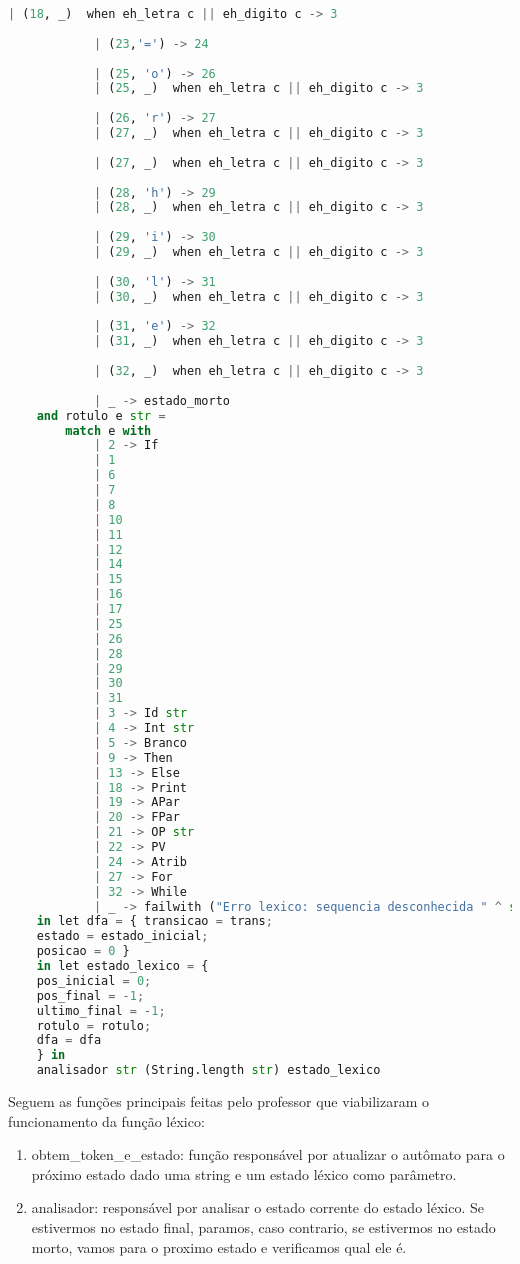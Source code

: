 \documentclass[hidelinks,12pt]{article}
\begin{document}
\begin{lstlisting}[caption=Código em python,language=python]
			| (18, _)  when eh_letra c || eh_digito c -> 3
			
			| (23,'=') -> 24
			
			| (25, 'o') -> 26
			| (25, _)  when eh_letra c || eh_digito c -> 3
			
			| (26, 'r') -> 27
			| (27, _)  when eh_letra c || eh_digito c -> 3
			
			| (27, _)  when eh_letra c || eh_digito c -> 3
			
			| (28, 'h') -> 29
			| (28, _)  when eh_letra c || eh_digito c -> 3
			
			| (29, 'i') -> 30
			| (29, _)  when eh_letra c || eh_digito c -> 3
			
			| (30, 'l') -> 31
			| (30, _)  when eh_letra c || eh_digito c -> 3
			
			| (31, 'e') -> 32
			| (31, _)  when eh_letra c || eh_digito c -> 3
			
			| (32, _)  when eh_letra c || eh_digito c -> 3
			
			| _ -> estado_morto
	and rotulo e str =
		match e with
			| 2 -> If
			| 1 
			| 6
			| 7
			| 8
			| 10
			| 11
			| 12
			| 14
			| 15
			| 16
			| 17
			| 25
			| 26
			| 28
			| 29
			| 30
			| 31
			| 3 -> Id str
			| 4 -> Int str
			| 5 -> Branco
			| 9 -> Then
			| 13 -> Else
			| 18 -> Print
			| 19 -> APar
			| 20 -> FPar
			| 21 -> OP str
			| 22 -> PV
			| 24 -> Atrib
			| 27 -> For
			| 32 -> While
			| _ -> failwith ("Erro lexico: sequencia desconhecida " ^ str)
	in let dfa = { transicao = trans;
	estado = estado_inicial;
	posicao = 0 }
	in let estado_lexico = {
	pos_inicial = 0;
	pos_final = -1;
	ultimo_final = -1;
	rotulo = rotulo;
	dfa = dfa
	} in
	analisador str (String.length str) estado_lexico
	\end{lstlisting}
	
	
	Seguem as funções principais feitas pelo professor que viabilizaram o funcionamento da função léxico:
	\begin{enumerate}
		\item obtem\_token\_e\_estado: função responsável por atualizar o autômato para o próximo estado dado uma string e um estado léxico como parâmetro.
		\item analisador: responsável por analisar o estado corrente do estado léxico. Se estivermos no estado final, paramos, caso contrario, se estivermos no estado morto, vamos para o proximo estado e verificamos qual ele é.
	\end{enumerate}
	
\end{document}
